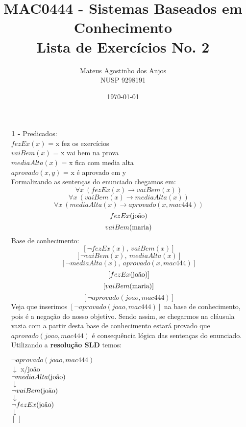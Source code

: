\documentclass[12pt]{article}
\title{MAC0444 - Sistemas Baseados em Conhecimento \\
Lista de Exercícios No. 2
}
\author{Mateus Agostinho dos Anjos\\NUSP 9298191}
\date{\today}
\begin{document}
	\maketitle
	\begin{itemize}
		\item[\textbf{1 -}]
			\hfill\newline
			Predicados:\\
			$fezEx(x)$ = x fez os exercícios\\
			$vaiBem(x)$ = x vai bem na prova\\
			$mediaAlta(x)$ = x fica com media alta\\
			$aprovado(x, y)$ = x é aprovado em y \\
			\newline
			Formalizando as sentenças do enunciado chegamos em:\\
			$$\forall x \ (fezEx(x) \rightarrow vaiBem(x))$$
			$$\forall x \ (vaiBem(x) \rightarrow mediaAlta(x))$$
			$$\forall x \ (mediaAlta(x) \rightarrow aprovado(x, mac444))$$
			$$fezEx(\textnormal{joão})$$
			$$vaiBem(\textnormal{maria})$$
			Base de conhecimento:\\
			$$[\neg fezEx(x), \ vaiBem(x)]$$
			$$[\neg vaiBem(x), \ mediaAlta(x)]$$
			$$[\neg mediaAlta(x), \ aprovado(x, mac444)] $$
			$$[fezEx(\textnormal{joão})]$$
			$$[vaiBem(\textnormal{maria})]$$
			$$[\neg aprovado(joao, mac444)]$$
			Veja que inserimos $[\neg aprovado(joao, mac444)]$ na base de conhecimento, pois
			é a negação do nosso objetivo. Sendo assim, se chegarmos na cláusula vazia com
			a partir desta base de conhecimento estará provado que $aprovado(joao, mac444)$
			é consequência lógica das sentenças do enunciado.\\
			\newline
			Utilizando a \textbf{resolução SLD} temos:\\
			\begin{center}
				$\neg aprovado(joao, mac444)$\\
				$\downarrow$ x/joão\\
				$\neg mediaAlta(\textnormal{joão})$\\
				$\downarrow$\\
				$\neg vaiBem(\textnormal{joão})$\\
				$\downarrow$\\
				$\neg fezEx(\textnormal{joão})$\\
				$\downarrow$\\
				$[ \ ]$
				
			\end{center}
	\end{itemize}
\end{document}
